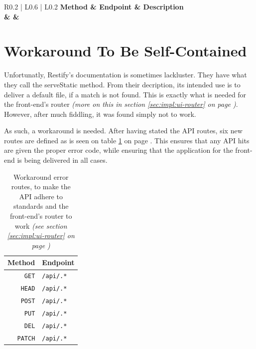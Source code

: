 		\begin{table}[p]
			
			\begin{tabularx}{\textwidth}{ R{0.2} | L{0.6} | L{0.2} }
				\bfseries Method & \bfseries Endpoint & \bfseries Description%
				{\\\hline\method & \texttt{\endpoint} & \description}%
			\end{tabularx}

			\caption{API endpoints for the Auth resource.}
			\label{tab:api:auth}
		\end{table}

	\section{Workaround To Be Self-Contained}
		Unfortunatly, Restify's documentation is sometimes lackluster. They have what they call the serveStatic method. From their decription, its intended use is to deliver a default file, if a match is not found. This is exactly what is needed for the front-end's router \emph{(more on this in section \ref{sec:impl:ui-router} on page \pageref{sec:impl:ui-router})}. However, after much fiddling, it was found simply not to work.

		As such, a workaround is needed. After having stated the API routes, six new routes are defined as is seen on table \ref{tab:api:workaround} on page \pageref{tab:api:workaround}. This ensures that any API hits are given the proper error code, while ensuring that the application for the front-end is being delivered in all cases.
		\begin{table}
			\centering
			\begin{tabular}{r | l}
				\textbf{Method} & \textbf{Endpoint} \\
				\hline
				\verb=GET=		& \verb=/api/.*= \\
				\verb=HEAD=		& \verb=/api/.*= \\	
				\verb=POST=		& \verb=/api/.*= \\	
				\verb=PUT=		& \verb=/api/.*= \\
				\verb=DEL=		& \verb=/api/.*= \\
				\verb=PATCH=	& \verb=/api/.*= \\	
			\end{tabular}
			\caption{Workaround error routes, to make the API adhere to standards and the front-end's router to work \emph{(see section \ref{sec:impl:ui-router} on page \pageref{sec:impl:ui-router})}}
			\label{tab:api:workaround}
		\end{table}

